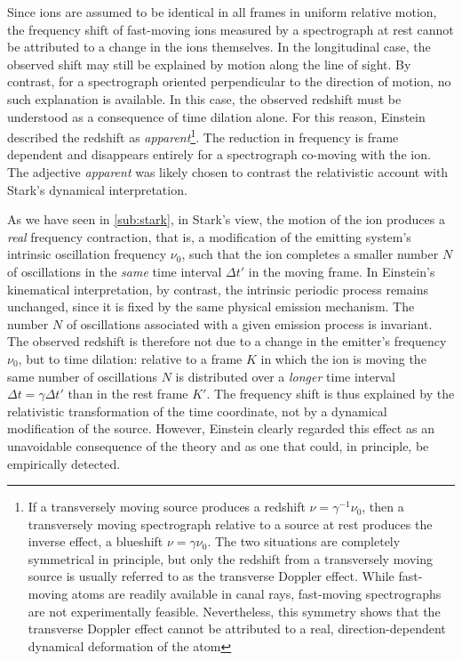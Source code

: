 \documentclass[pdflatex,sn-basic]{sn-jnl}
\begin{document}
Since ions are assumed to be identical in all frames in uniform relative motion, the frequency shift of fast-moving ions measured by a spectrograph at rest cannot be attributed to a change in the ions themselves. In the longitudinal case, the observed shift may still be explained by motion along the line of sight. By contrast, for a spectrograph oriented perpendicular to the direction of motion, no such explanation is available. In this case, the observed redshift must be understood as a consequence of time dilation alone. For this reason, Einstein described the redshift as \emph{apparent}\footnote{If a transversely moving source produces a redshift $\nu=\gamma^{-1}\nu_0$, then a transversely moving spectrograph relative to a source at rest produces the inverse effect, a blueshift $\nu=\gamma\nu_0$. The two situations are completely symmetrical in principle, but only the redshift from a transversely moving source is usually referred to as the transverse Doppler effect. While fast-moving atoms are readily available in canal rays, fast-moving spectrographs are not experimentally feasible. Nevertheless, this symmetry shows that the transverse Doppler effect cannot be attributed to a real, direction-dependent dynamical deformation of the atom}. The reduction in frequency is frame dependent and disappears entirely for a spectrograph co-moving with the ion. The adjective \emph{apparent} was likely chosen to contrast the relativistic account with Stark’s dynamical interpretation.

As we have seen in \cref{sub:stark}, in Stark’s view, the motion of the ion produces a \emph{real} frequency contraction, that is, a modification of the emitting system’s intrinsic oscillation frequency $\nu_0$, such that the ion completes a smaller number $N$ of oscillations in the \emph{same} time interval $\Delta t'$ in the moving frame. In Einstein’s kinematical interpretation, by contrast, the intrinsic periodic process remains unchanged, since it is fixed by the same physical emission mechanism. The number $N$ of oscillations associated with a given emission process is invariant. The observed redshift is therefore not due to a change in the emitter’s frequency $\nu_0$, but to time dilation: relative to a frame $K$ in which the ion is moving the same number of oscillations $N$ is distributed over a \emph{longer} time interval $\Delta t=\gamma\Delta t'$ than in the rest frame $K'$. The frequency shift is thus explained by the relativistic transformation of the time coordinate, not by a dynamical modification of the source. However, Einstein clearly regarded this  effect as an unavoidable consequence of the theory and as one that could, in principle, be empirically detected. 
\end{document}
